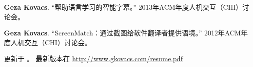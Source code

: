 \documentclass[margin,line]{resume}
\begin{document}
\begin{resume}
\textbf{Geza Kovacs}. ``帮助语言学习的智能字幕。'' 2013年ACM年度人机交互（CHI）讨论会。

\textbf{Geza Kovacs}. ``ScreenMatch：通过截图给软件翻译者提供语境。'' 2012年ACM年度人机交互（CHI）讨论会。


\begin{small}
\begin{center}
更新于 \zhtoday。 最新版本在 \href{http://www.gkovacs.com/resume.pdf}{http://www.gkovacs.com/resume.pdf}
\end{center}
\end{small}

\end{resume}
\end{document}

